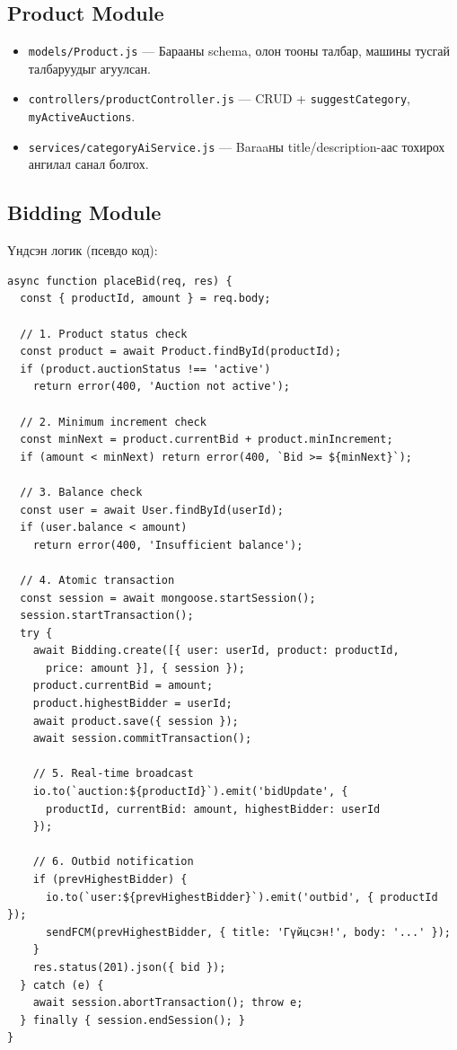 \documentclass[12pt, a4paper]{report}
\begin{document}
\subsection{Product Module}

\begin{itemize}
  \item \texttt{models/Product.js} — Барааны schema, олон тооны талбар, машины тусгай талбаруудыг агуулсан.
  \item \texttt{controllers/productController.js} — CRUD + \texttt{suggestCategory}, \texttt{myActiveAuctions}.
  \item \texttt{services/categoryAiService.js} — Baraaны title/description-аас тохирох ангилал санал болгох.
\end{itemize}

\subsection{Bidding Module}

Үндсэн логик (псевдо код):

\begin{lstlisting}[caption={Bid placement логик}, label={lst:placebid}]
async function placeBid(req, res) {
  const { productId, amount } = req.body;

  // 1. Product status check
  const product = await Product.findById(productId);
  if (product.auctionStatus !== 'active')
    return error(400, 'Auction not active');

  // 2. Minimum increment check
  const minNext = product.currentBid + product.minIncrement;
  if (amount < minNext) return error(400, `Bid >= ${minNext}`);

  // 3. Balance check
  const user = await User.findById(userId);
  if (user.balance < amount)
    return error(400, 'Insufficient balance');

  // 4. Atomic transaction
  const session = await mongoose.startSession();
  session.startTransaction();
  try {
    await Bidding.create([{ user: userId, product: productId,
      price: amount }], { session });
    product.currentBid = amount;
    product.highestBidder = userId;
    await product.save({ session });
    await session.commitTransaction();

    // 5. Real-time broadcast
    io.to(`auction:${productId}`).emit('bidUpdate', {
      productId, currentBid: amount, highestBidder: userId
    });

    // 6. Outbid notification
    if (prevHighestBidder) {
      io.to(`user:${prevHighestBidder}`).emit('outbid', { productId });
      sendFCM(prevHighestBidder, { title: 'Гүйцсэн!', body: '...' });
    }
    res.status(201).json({ bid });
  } catch (e) {
    await session.abortTransaction(); throw e;
  } finally { session.endSession(); }
}
\end{lstlisting}
\end{document}
